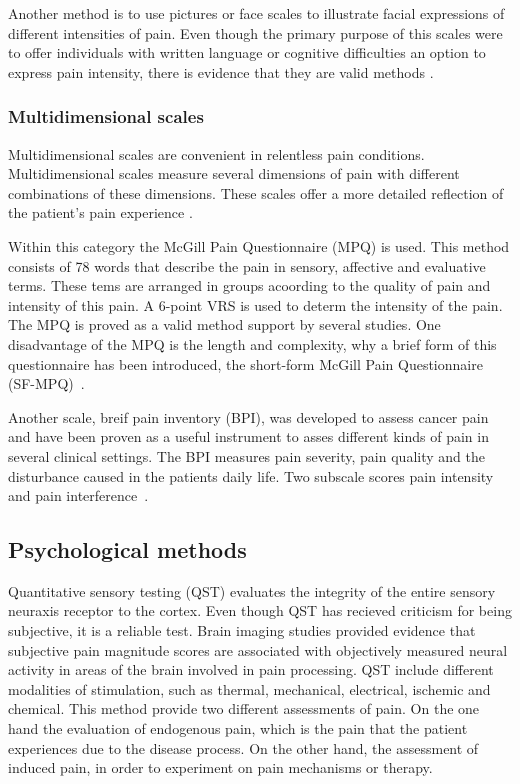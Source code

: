 Another method is to use pictures or face scales to illustrate facial expressions of different intensities of pain. Even though the primary purpose of this scales were to offer individuals with written language or cognitive difficulties an option to express pain intensity, there is evidence that they are valid methods \cite{Jensen2001}. 

\subsubsection{Multidimensional scales}

Multidimensional scales are convenient in relentless pain conditions. Multidimensional scales measure several dimensions of pain with different combinations of these dimensions. These scales offer a more detailed reflection of the patient's pain experience \cite{Briggs2010}. 

Within this category the McGill Pain Questionnaire (MPQ) is used. This method consists of 78 words that describe the pain in sensory, affective and evaluative terms. These tems are arranged in groups acoording to the quality of pain and intensity of this pain. A 6-point VRS is used to determ the intensity of the pain. The MPQ is proved as a valid method support by several studies.  One disadvantage of the MPQ is the length and complexity, why a brief form of this questionnaire has been introduced, the short-form McGill Pain Questionnaire (SF-MPQ)~\cite{Katz2001}. 

Another scale, breif pain inventory (BPI), was developed to assess cancer pain and have been proven as a useful instrument to asses different kinds of pain in several clinical settings. The BPI measures pain severity, pain quality and the disturbance caused in the patients daily life. Two subscale scores pain intensity and pain interference~\cite{Katz2001}.  

\subsection{Psychological methods}
Quantitative sensory testing (QST) evaluates the integrity of the entire sensory neuraxis receptor to the cortex. Even though QST has recieved criticism for being subjective, it is a reliable test. Brain imaging studies provided evidence that subjective pain magnitude scores are associated with objectively measured neural activity in areas of the brain involved in pain processing. QST include different modalities of stimulation, such as thermal, mechanical, electrical, ischemic and chemical. This method provide two different assessments of pain. On the one hand the  evaluation of endogenous pain, which is the pain that the patient experiences due to the disease process. On the other hand, the assessment of induced pain, in order to experiment on pain mechanisms or therapy. \cite{Yarnitsky2006}

